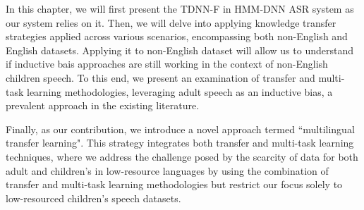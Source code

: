In this chapter, we will first present the \ac{TDNN-F} in \ac{HMM-DNN} \ac{ASR} system as our system relies on it. Then, we will delve into applying knowledge transfer strategies applied across various scenarios, encompassing both non-English and English datasets. Applying it to non-English dataset will allow us to understand if inductive bais approaches are still working in the context of non-English children speech. To this end, we present an examination of transfer and multi-task learning methodologies, leveraging adult speech as an inductive bias, a prevalent approach in the existing literature. 

Finally, as our contribution, we introduce a novel approach termed ``multilingual transfer learning". This strategy integrates both transfer and multi-task learning techniques, where we address the challenge posed by the scarcity of data for both adult and children's in low-resource languages by using the combination of transfer and multi-task learning methodologies but restrict our focus solely to low-resourced  children's speech datasets.

